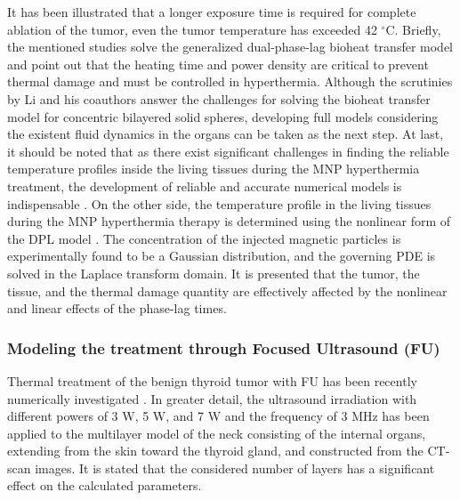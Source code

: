 \documentclass[sn-mathphys]{sn-jnl}%
\theoremstyle{thmstyleone}%
\theoremstyle{thmstyletwo}%
\theoremstyle{thmstylethree}%
\begin{document}
{It has been illustrated that a longer exposure time is required for complete ablation of the tumor, even the tumor temperature has exceeded 42 $^\circ$C. Briefly, the mentioned studies solve the generalized dual-phase-lag bioheat transfer model and point out that the heating time and power density are critical to prevent thermal damage and must be controlled in hyperthermia. Although the scrutinies by Li and his coauthors answer the challenges for solving the bioheat transfer model for concentric bilayered solid spheres, developing full models considering the existent fluid dynamics in the organs can be taken as the next step. At last, it should be noted that as there exist significant challenges in finding the reliable temperature profiles inside the living tissues during the MNP hyperthermia treatment, the development of reliable and accurate numerical models is indispensable \cite{Raouf2020}. On the other side, the temperature profile in the living tissues during the MNP hyperthermia therapy is determined using the nonlinear form of the DPL model \cite{HMYoussef2019}. The concentration of the injected magnetic particles is experimentally found to be a Gaussian distribution, and the governing PDE is solved in the Laplace transform domain. It is presented that the tumor, the tissue, and the thermal damage quantity are effectively affected by the nonlinear and linear effects of the phase-lag times.

\subsubsection{Modeling the treatment through Focused Ultrasound (FU)}
Thermal treatment of the benign thyroid tumor with FU has been recently numerically investigated \cite{Namakshenas2019}. In greater detail, the ultrasound irradiation with different powers of 3 W, 5 W, and 7 W and the frequency of 3 MHz has been applied to the multilayer model of the neck consisting of the internal organs, extending from the skin toward the thyroid gland, and constructed from the CT-scan images. It is stated that the considered number of layers has a significant effect on the calculated parameters.

}
\end{document}
